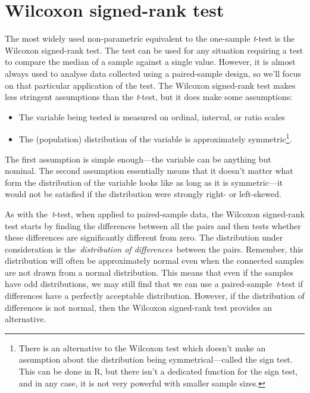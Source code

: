 \documentclass[
]{book}
\begin{document}
\hypertarget{wilcoxon-signed-rank-test}{%
\section{Wilcoxon signed-rank test}\label{wilcoxon-signed-rank-test}}

The most widely used non-parametric equivalent to the one-sample \emph{t}-test is the Wilcoxon signed-rank test. The test can be used for any situation requiring a test to compare the median of a sample against a single value. However, it is almost always used to analyse data collected using a paired-sample design, so we'll focus on that particular application of the test. The Wilcoxon signed-rank test makes less stringent assumptions than the \emph{t}-test, but it does make some assumptions:

\begin{itemize}
\item
  The variable being tested is measured on ordinal, interval, or ratio scales
\item
  The (population) distribution of the variable is approximately symmetric\footnote{There is an alternative to the Wilcoxon test which doesn't make an assumption about the distribution being symmetrical---called the sign test. This can be done in R, but there isn't a dedicated function for the sign test, and in any case, it is not very powerful with smaller sample sizes.}.
\end{itemize}

The first assumption is simple enough---the variable can be anything but nominal. The second assumption essentially means that it doesn't matter what form the distribution of the variable looks like as long as it is symmetric---it would not be satisfied if the distribution were strongly right- or left-skewed.

As with the~\emph{t}-test, when applied to paired-sample data, the Wilcoxon signed-rank test starts by finding the differences between all the pairs and then tests whether these differences are significantly different from zero. The distribution under consideration is the~\emph{distribution of differences}~between the pairs. Remember, this distribution will often be approximately normal even when the connected samples are not drawn from a normal distribution. This means that even if the samples have odd distributions, we may still find that we can use a paired-sample~\emph{t}-test if differences have a perfectly acceptable distribution. However, if the distribution of differences is not normal, then the Wilcoxon signed-rank test provides an alternative.
\end{document}

